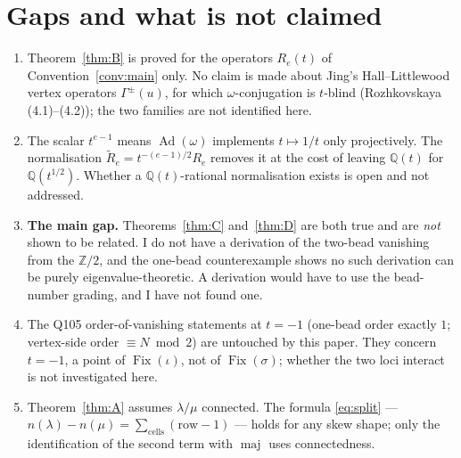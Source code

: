 \documentclass[11pt]{article}
\theoremstyle{definition}
\DeclareMathOperator{\maj}{maj}
\newcommand{\Z}{\mathbb{Z}}
\newcommand{\Q}{\mathbb{Q}}
\newcommand{\Ad}{\operatorname{Ad}}
\begin{document}
\section{Gaps and what is not claimed}

\begin{enumerate}
\item Theorem~\ref{thm:B} is proved for the operators $R_e(t)$ of
Convention~\ref{conv:main} only.  No claim is made about Jing's Hall--Littlewood
vertex operators $\Gamma^\pm(u)$, for which $\omega$-conjugation is $t$-blind
(Rozhkovskaya (4.1)--(4.2)); the two families are not identified here.
\item The scalar $t^{e-1}$ means $\Ad(\omega)$ implements $t\mapsto1/t$ only
projectively.  The normalisation $\widetilde R_e=t^{-(e-1)/2}R_e$ removes it at the
cost of leaving $\Q(t)$ for $\Q(t^{1/2})$.  Whether a $\Q(t)$-rational normalisation
exists is open and not addressed.
\item \textbf{The main gap.} Theorems~\ref{thm:C} and~\ref{thm:D} are both true and
are \emph{not} shown to be related.  I do not have a derivation of the two-bead
vanishing from the $\Z/2$, and the one-bead counterexample shows no such derivation
can be purely eigenvalue-theoretic.  A derivation would have to use the bead-number
grading, and I have not found one.
\item The Q105 order-of-vanishing statements at $t=-1$ (one-bead order exactly $1$;
vertex-side order $\equiv N \bmod 2$) are untouched by this paper.  They concern
$t=-1$, a point of $\operatorname{Fix}(\iota)$, not of $\operatorname{Fix}(\sigma)$;
whether the two loci interact is not investigated here.
\item Theorem~\ref{thm:A} assumes $\lambda/\mu$ connected.  The formula
\eqref{eq:split} --- $n(\lambda)-n(\mu)=\sum_{\text{cells}}(\mathrm{row}-1)$ --- holds
for any skew shape; only the identification of the second term with $\maj$ uses
connectedness.
\end{enumerate}
\end{document}
